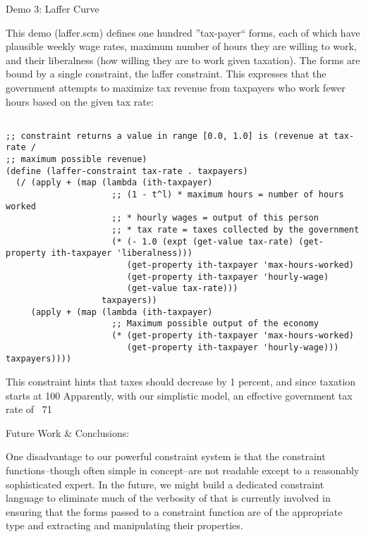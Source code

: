 \documentclass[12pt,a4paper]{article}
\begin{document}
Demo 3: Laffer Curve

This demo (laffer.scm) defines one hundred ''tax-payer`` forms, each of which have plausible weekly wage rates, maximum number of hours they are willing to work, and their liberalness (how willing they are to work given taxation).  The forms are bound by a single constraint, the laffer constraint. This expresses that the government attempts to maximize tax revenue from taxpayers who work fewer hours based on the given tax rate:
\begin{lstlisting}

;; constraint returns a value in range [0.0, 1.0] is (revenue at tax-rate /
;; maximum possible revenue)
(define (laffer-constraint tax-rate . taxpayers)
  (/ (apply + (map (lambda (ith-taxpayer)
                     ;; (1 - t^l) * maximum hours = number of hours worked
                     ;; * hourly wages = output of this person
                     ;; * tax rate = taxes collected by the government
                     (* (- 1.0 (expt (get-value tax-rate) (get-property ith-taxpayer 'liberalness)))
                        (get-property ith-taxpayer 'max-hours-worked)
                        (get-property ith-taxpayer 'hourly-wage)
                        (get-value tax-rate)))
                   taxpayers))
     (apply + (map (lambda (ith-taxpayer)
                     ;; Maximum possible output of the economy
                     (* (get-property ith-taxpayer 'max-hours-worked)
                        (get-property ith-taxpayer 'hourly-wage))) taxpayers))))
\end{lstlisting}

This constraint hints that taxes should decrease by 1 percent, and since taxation starts at 100%
Apparently, with our simplistic model, an effective government tax rate of ~71%

Future Work \& Conclusions:

One disadvantage to our powerful constraint system is that the constraint functions--though often simple in concept--are not readable except to a reasonably sophisticated expert. In the future, we might build a dedicated constraint language to eliminate much of the verbosity of that is currently involved in ensuring that the forms passed to a constraint function are of the appropriate type and extracting and manipulating their properties.
\end{document}

